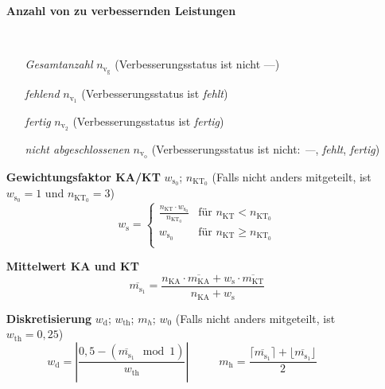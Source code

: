 \begin{enumerate}[label=\textbf{\textbullet}, align=left, leftmargin=*]
	\item[\textbf{Anzahl von zu verbessernden Leistungen}] { \scriptsize \mbox{} \
	\setlength{\columnsep}{-20pt}
	\begin{multicols}{2}
	\begin{enumerate}[label=\textbf{\textbullet}, align=left, leftmargin=*]
		\item[\textit{Gesamtanzahl}] $n_{\mathrm{v}_\mathrm{g}}$ (Verbesserungsstatus ist nicht \glqq ---\grqq{})
		\item[\textit{fehlend}] $n_{\mathrm{v}_1}$ (Verbesserungsstatus ist \glqq \textit{fehlt}\grqq{})
		\item[\textit{fertig}] $n_{\mathrm{v}_2}$ (Verbesserungsstatus ist \glqq \textit{fertig}\grqq{})
		\item[\textit{nicht abgeschlossenen}] $n_{\mathrm{v}_\mathrm{o}}$ (Verbesserungsstatus ist nicht: \glqq\textit{---}\grqq{}, \glqq\textit{fehlt}\grqq{}, \glqq\textit{fertig}\grqq{})
	\end{enumerate}
	\end{multicols}
	}
	\vspace*{-12pt}
	\item[\textbf{Gewichtungsfaktor KA/KT}] $w_{\mathrm{s}_0}$; $n_{\mathrm{KT}_0}$  (Falls nicht anders mitgeteilt, ist $w_{\mathrm{s}_0}=1$ und $n_{\mathrm{KT}_0}=3$)
	\[
	w_{\mathrm{s}} =
	\begin{cases}
		\frac{n_{\mathrm{KT}} \cdot w_{\mathrm{s}_0}}{n_{\mathrm{KT}_0}} & \text{für }    n_{\mathrm{KT}} < n_{\mathrm{KT}_0} \\
		w_{\mathrm{s}_0} & \text{für }    n_{\mathrm{KT}} \geq n_{\mathrm{KT}_0} \\
	\end{cases}
	\]	
	\item[\textbf{Mittelwert KA und KT}] \vspace{-0.5cm}
	\[
	\overline{m_{\mathrm{s}_1}} = \frac{ n_{\mathrm{KA}} \cdot \overline{m_{\mathrm{KA}}} + w_{\mathrm{s}} \cdot \overline{m_{\mathrm{KT}}} }{n_{\mathrm{KA}} + w_{\mathrm{s}}}
	\]
	\item[\textbf{Diskretisierung}] $w_{\mathrm{d}}$; $w_{\mathrm{th}}$; $m_h$; $w_{0}$ (Falls nicht anders mitgeteilt, ist $w_{\mathrm{th}}=0{,}25$) \cite{wikigaussklammer,wikibetrag,wikimodulo}
	\[
	w_{\mathrm{d}} = \left| \frac{0{,}5 - (\overline{m_{\mathrm{s}_1}} \mod 1)}{w_{\mathrm{th}}} \right|
	\,\hspace{1cm}\,
	m_{\mathrm{h}} = \frac{\lceil \overline{m_{\mathrm{s}_1}} \rceil + \lfloor \overline{m_{\mathrm{s}_1}} \rfloor}{2}
	\,\hspace{1cm}\,
\]
\end{enumerate}
